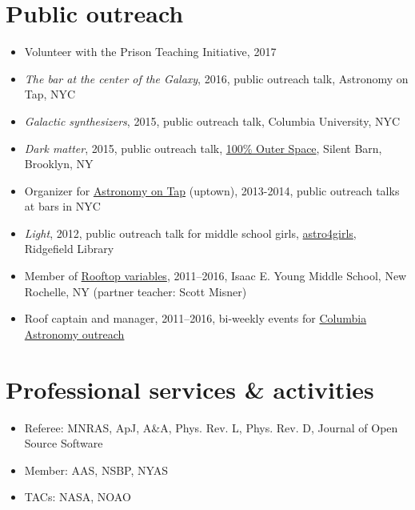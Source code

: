\documentclass[12pt, letterpaper]{apw-cv}
\begin{document}
\section*{Public outreach}

\begin{itemize}
    \item Volunteer with the Prison Teaching Initiative, 2017
    \item \emph{The bar at the center of the Galaxy}, 2016, public outreach talk, Astronomy on Tap, NYC
    \item \emph{Galactic synthesizers}, 2015, public outreach talk, Columbia University, NYC
    \item \emph{Dark matter}, 2015, public outreach talk, \href{http://silentbarn.org/2015/03/100-outer-space-party}{100\% Outer Space}, Silent Barn, Brooklyn, NY
    \item Organizer for \href{http://astronomyontap.org/}{Astronomy on Tap} (uptown), 2013-2014, public outreach talks at bars in NYC
    \item \emph{Light}, 2012, public outreach talk for middle school girls, \href{http://www.newstimes.com/news/article/Astronomer-Shoot-for-the-stars-3380793.php}{astro4girls}, Ridgefield Library
    \item Member of \href{http://rv.astro.columbia.edu}{Rooftop variables}, 2011--2016, Isaac E. Young Middle School, New Rochelle, NY (partner teacher: Scott Misner)
    \item Roof captain and manager, 2011--2016, bi-weekly events for \href{http://outreach.astro.columbia.edu/}{Columbia Astronomy outreach}
\end{itemize}

\section*{Professional services \& activities}

\begin{itemize}
	\item Referee: MNRAS, ApJ, A\&A, Phys. Rev. L, Phys. Rev. D, Journal of Open Source Software
	\item Member: AAS, NSBP, NYAS
    \item TACs: NASA, NOAO
\end{itemize}
\end{document}
